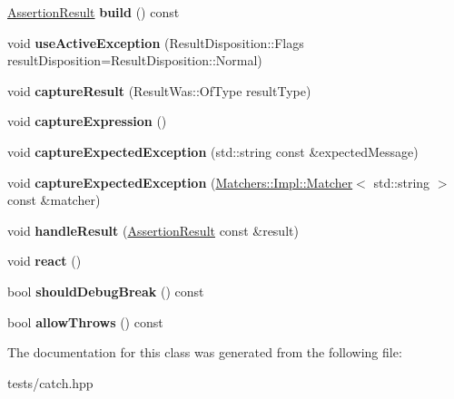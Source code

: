 \begin{DoxyCompactItemize}
\item 
\mbox{\label{class_catch_1_1_result_builder_a4fc96e7bb8b5f7119a8e79692ec97808}} 
\hyperlink{class_catch_1_1_assertion_result}{Assertion\+Result} {\bfseries build} () const
\item 
\mbox{\label{class_catch_1_1_result_builder_a5bbd2f14a678f3e8d0f791ac6d233d65}} 
void {\bfseries use\+Active\+Exception} (Result\+Disposition\+::\+Flags result\+Disposition=Result\+Disposition\+::\+Normal)
\item 
\mbox{\label{class_catch_1_1_result_builder_a10e467f7b7a4976e5d148b4d5066e8fd}} 
void {\bfseries capture\+Result} (Result\+Was\+::\+Of\+Type result\+Type)
\item 
\mbox{\label{class_catch_1_1_result_builder_af2ae2343965802eeeb0abbd4ea9d2d36}} 
void {\bfseries capture\+Expression} ()
\item 
\mbox{\label{class_catch_1_1_result_builder_a9ac96f6220c8dd8e4feee725c6228d77}} 
void {\bfseries capture\+Expected\+Exception} (std\+::string const \&expected\+Message)
\item 
\mbox{\label{class_catch_1_1_result_builder_a7d443d632eaeabe2cb36218b8dcb7400}} 
void {\bfseries capture\+Expected\+Exception} (\hyperlink{struct_catch_1_1_matchers_1_1_impl_1_1_matcher}{Matchers\+::\+Impl\+::\+Matcher}$<$ std\+::string $>$ const \&matcher)
\item 
\mbox{\label{class_catch_1_1_result_builder_ad8bb17e4ac590b75bf8630d8f3502f4e}} 
void {\bfseries handle\+Result} (\hyperlink{class_catch_1_1_assertion_result}{Assertion\+Result} const \&result)
\item 
\mbox{\label{class_catch_1_1_result_builder_a3085cdc46533d45bed6f652a2ac295c0}} 
void {\bfseries react} ()
\item 
\mbox{\label{class_catch_1_1_result_builder_a6f2b0dbcc6cc5e0a500ac45f2534e3e7}} 
bool {\bfseries should\+Debug\+Break} () const
\item 
\mbox{\label{class_catch_1_1_result_builder_a0428fd78ab9e8e6f1aca6855f20fc715}} 
bool {\bfseries allow\+Throws} () const
\end{DoxyCompactItemize}


The documentation for this class was generated from the following file\+:\begin{DoxyCompactItemize}
\item 
tests/catch.\+hpp\end{DoxyCompactItemize}
